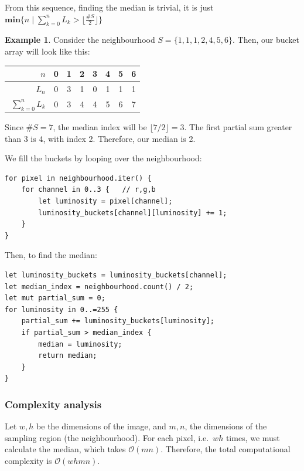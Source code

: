 \documentclass[12pt]{article}
\theoremstyle{definition}
\newtheorem*{example}{Example}
\begin{document}
From this sequence, finding the median is trivial, it is just $\mathbf{min}\big\{n \mid \sum_{k=0}^n L_k > \lfloor \frac{\#S}{2} \rfloor \big\}$

\begin{example}
    Consider the neighbourhood $S = \{1,1,1,2,4,5,6\}$.
    Then, our bucket array will look like this:
    \begin{table}[H]\centering
        \begin{tabular}{|r|c|c|c|c|c|c|c|}
            \hline
            $\phantom{\big|}n$                & 0 & 1 & 2 & 3 & 4 & 5 & 6 \\ \hline
            $\phantom{\big|}L_n$              & 0 & 3 & 1 & 0 & 1 & 1 & 1 \\ \hline\hline
            $\phantom{\Big|}\sum_{k=0}^n L_k$ & 0 & 3 & 4 & 4 & 5 & 6 & 7 \\
            \hline
        \end{tabular}
    \end{table}
    Since $\#S = 7$, the median index will be $\lfloor 7/2 \rfloor = 3$.
    The first partial sum greater than 3 is 4, with index 2. Therefore, our median is 2.
\end{example}

We fill the buckets by looping over the neighbourhood:
\begin{lstlisting}
for pixel in neighbourhood.iter() {
    for channel in 0..3 {   // r,g,b
        let luminosity = pixel[channel];
        luminosity_buckets[channel][luminosity] += 1;
    }
}
\end{lstlisting}

Then, to find the median:
\begin{lstlisting}
let luminosity_buckets = luminosity_buckets[channel];
let median_index = neighbourhood.count() / 2;
let mut partial_sum = 0;
for luminosity in 0..=255 {
    partial_sum += luminosity_buckets[luminosity];
    if partial_sum > median_index {
        median = luminosity;
        return median;
    }
}

\end{lstlisting}


\subsubsection{Complexity analysis}

Let $w,h$ be the dimensions of the image, and $m,n$, the dimensions of the sampling region (the neighbourhood).
For each pixel, i.e.\ $wh$ times, we must calculate the median, which takes $\mathcal{O}(mn)$.
Therefore, the total computational complexity is $\mathcal{O}(whmn)$.
\end{document}
